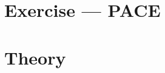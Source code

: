 \documentclass{beamer}
\begin{document}


\section{Exercise --- PACE}



\section{Theory}








\end{document}
